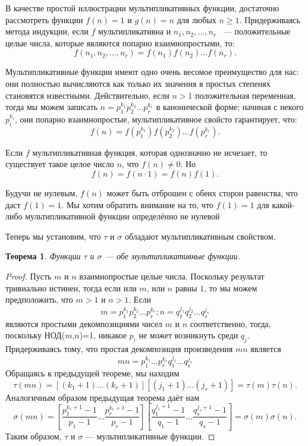 \documentclass[11pt]{article}
\newtheorem{theorem}{Теорема}
\begin{document}
	В качестве простой иллюстрации мультипликативных функции, достаточно рассмотреть функции $f(n)=1$ и $g(n)=n$ для любых $n\ge1$. Придерживаясь метода индукции, если $f$ мультипликативна и $n_1,n_2,\ldots,n_r$  ~--- положительные целые числа, которые являются попарно взаимнопростыми, то:
	$$
		f(n_1,n_2,\ldots,n_r)=f(n_1)f(n_2)\ldots f(n_r).
	$$

	Мультипликативные функции имеют одно очень весомое преимущество для нас: они полностью вычисляются как только их значения в простых степенях становятся известными. Действительно, если $n>1$ положительная переменная, тогда мы можем записать $n=p_1^{k_1}p_2^{k_2}\ldots p_r^{k_r}$ в канонической форме; начиная с некого $p_i^{k_i}$, они попарно взаимнопростые, мультипликативное свойсто гарантирует, что:
	$$
		f(n)=f(p_1^{k_1})f(p_2^{k_2})\ldots f( p_r^{k_r}).
	$$
	
	Если $f$ мультипликативная функция, которая однозначно не исчезает, то существует такое целое число $n$, что $f(n)\ne0$. Но
	$$
		f(n)=f(n\cdot1)=f(n)f(1).
	$$
	
	Будучи не нулевым, $f(n)$ может быть отброшен с обеих сторон равенства, что даст $f(1)=1$. Мы хотим обратить внимание на то, что $f(1)=1$ для какой-либо мультипликативной функции определённо не нулевой
	
	Теперь мы установим, что $\tau$ и $\sigma$ обладают мультипликативным свойством.  
	\begin{theorem}
		Функции $\tau$ и $\sigma$ --- обе мультипликативные функции.
	\end{theorem}

	\begin{proof}
		Пусть $m$ и $n$ взаимнопростые целые числа. Поскольку результат тривиально истинен, тогда если или $m$, или $n$ равны $1$, то мы можем предположить, что $m>1$ и $n>1$. Если
		$$
			m=p_1^{k_1}p_2^{k_2}\ldots p_r^{k_r}; n=q_1^{j_1}q_2^{j_2}\ldots q_s^{j_s}
		$$
		являются простыми декомпозициями чисел $m$ и $n$ соответственно, тогда, поскольку НОД($m$,$n$)=1, никакое $p_i$ не может возникнуть среди $q_j$. Придерживаясь тому, что простая декомпозиция произведения $mn$ является 
		$$
			mn=p_1^{k_1}\ldots p_r^{k_r}q_1^{j_1}\ldots q_s^{j_s}
		$$
		Обращаясь к предыдущей теореме, мы находим
		$$
			\tau(mn)=[(k_1+1)\ldots(k_r+1)][(j_1+1)\ldots(j_s+1)]=\tau(m)\tau(n).
		$$
		Аналогичным образом предыдущая теорема даёт нам
		$$
			\sigma(mn)=\left[\frac{p_1^{k_1+1}-1}{p_1-1}\ldots\frac{p_r^{k_r+1}-1}{p_r-1}\right]\left[\frac{q_1^{j_1+1}-1}{q_1-1}\ldots\frac{q_s^{j_s+1}-1}{q_s-1}\right]=\sigma(m)\sigma(n).
		$$
		Таким образом, $\tau$ и $\sigma$ --- мультипликативные функции.
	\end{proof}
		
\end{document}
